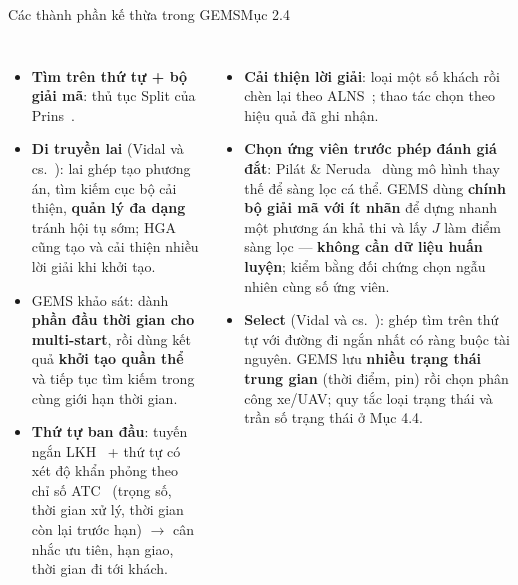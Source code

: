 \documentclass[aspectratio=169,10pt,t,xcolor={table}]{beamer}
\newcommand{\src}[1]{\hfill{\normalfont\footnotesize\color{white!62!navy}#1}}  %
\begin{document}
\begin{frame}{Các thành phần kế thừa trong GEMS\src{Mục 2.4}}
\begin{columns}[T,onlytextwidth]
\begin{itemize}\footnotesize
\item \textbf{Tìm trên thứ tự + bộ giải mã}: thủ tục Split của Prins~\cite{prins2004}.
\item \textbf{Di truyền lai} (Vidal và cs.~\cite{vidal2012,vidal2022}): lai ghép tạo phương án, tìm kiếm cục bộ cải thiện, \textbf{quản lý đa dạng} tránh hội tụ sớm; HGA~\cite{ha2020} cũng tạo và cải thiện nhiều lời giải khi khởi tạo.
\item[] {\color{tealc}GEMS khảo sát: dành \textbf{phần đầu thời gian cho multi-start}, rồi dùng kết quả \textbf{khởi tạo quần thể} và tiếp tục tìm kiếm trong cùng giới hạn thời gian.}
\item \textbf{Thứ tự ban đầu}: tuyến ngắn LKH~\cite{lkh2000} + thứ tự có xét độ khẩn phỏng theo chỉ số ATC~\cite{atc1987} (trọng số, thời gian xử lý, thời gian còn lại trước hạn) $\to$ cân nhắc ưu tiên, hạn giao, thời gian đi tới khách.
\end{itemize}
\begin{itemize}\footnotesize
\item \textbf{Cải thiện lời giải}: loại một số khách rồi chèn lại theo ALNS~\cite{ropke2006}; thao tác chọn theo hiệu quả đã ghi nhận.
\item \textbf{Chọn ứng viên trước phép đánh giá đắt}: Pilát \& Neruda~\cite{pilat2012} dùng mô hình thay thế để sàng lọc cá thể. GEMS dùng \textbf{chính bộ giải mã với ít nhãn} để dựng nhanh một phương án khả thi và lấy $J$ làm điểm sàng lọc --- \textbf{không cần dữ liệu huấn luyện}; kiểm bằng đối chứng chọn ngẫu nhiên cùng số ứng viên.
\item \textbf{Select} (Vidal và cs.~\cite{vidalselect}): ghép tìm trên thứ tự với đường đi ngắn nhất có ràng buộc tài nguyên. GEMS lưu \textbf{nhiều trạng thái trung gian} (thời điểm, pin) rồi chọn phân công xe/UAV; quy tắc loại trạng thái và trần số trạng thái ở Mục 4.4.
\end{itemize}
\end{columns}
\end{frame}
\end{document}
